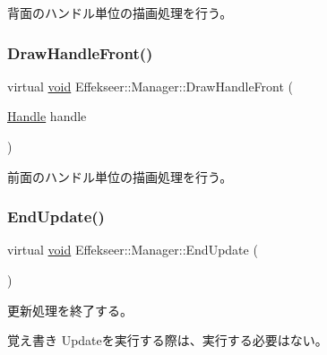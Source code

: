 背面のハンドル単位の描画処理を行う。 

\mbox{\label{class_effekseer_1_1_manager_a684708df101f9fdcf81096dcb058bce2}} 
\subsubsection{\texorpdfstring{Draw\+Handle\+Front()}{DrawHandleFront()}}
{\footnotesize\ttfamily virtual \mbox{\hyperlink{namespace_effekseer_ab34c4088e512200cf4c2716f168deb56}{void}} Effekseer\+::\+Manager\+::\+Draw\+Handle\+Front (\begin{DoxyParamCaption}\item[{\mbox{\hyperlink{namespace_effekseer_afba58b8d812da862190e9bbfc040824a}{Handle}}}]{handle }\end{DoxyParamCaption})\hspace{0.3cm}{\ttfamily [pure virtual]}}



前面のハンドル単位の描画処理を行う。 

\mbox{\label{class_effekseer_1_1_manager_a49311566caa5abcbff1b836473b046ab}} 
\subsubsection{\texorpdfstring{End\+Update()}{EndUpdate()}}
{\footnotesize\ttfamily virtual \mbox{\hyperlink{namespace_effekseer_ab34c4088e512200cf4c2716f168deb56}{void}} Effekseer\+::\+Manager\+::\+End\+Update (\begin{DoxyParamCaption}{ }\end{DoxyParamCaption})\hspace{0.3cm}{\ttfamily [pure virtual]}}



更新処理を終了する。 

\begin{DoxyNote}{覚え書き}
Updateを実行する際は、実行する必要はない。 
\end{DoxyNote}
\mbox{\label{class_effekseer_1_1_manager_ad95297e9170c9f9874eb6bf951aa5dc0}} 
